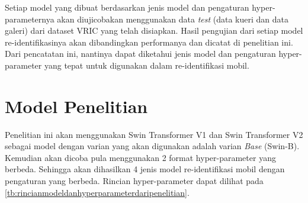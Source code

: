 Setiap model yang dibuat berdasarkan jenis model dan pengaturan hyper-parameternya akan diujicobakan menggunakan data \emph{test} 
(data kueri dan data galeri) dari dataset VRIC yang telah disiapkan. Hasil pengujian dari setiap model
re-identifikasinya akan dibandingkan performanya dan dicatat di penelitian ini. Dari pencatatan ini, nantinya dapat diketahui 
jenis model dan pengaturan hyper-parameter yang tepat untuk digunakan dalam re-identifikasi mobil.

\section{Model Penelitian}
\label{sec:modelpenelitian}

Penelitian ini akan menggunakan Swin Transformer V1 dan Swin Transformer V2 sebagai model dengan varian
yang akan digunakan adalah varian \emph{Base} (Swin-B). Kemudian akan dicoba pula menggunakan 2 format hyper-parameter yang 
berbeda. Sehingga akan dihasilkan 4 jenis model re-identifikasi mobil dengan pengaturan yang berbeda. Rincian hyper-parameter 
dapat dilihat pada \ref{tb:rincianmodeldanhyperparameterdaripenelitian}.

